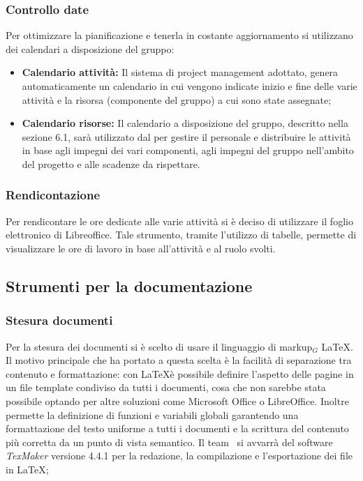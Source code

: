 \subsubsection{Controllo date}
Per ottimizzare la pianificazione e tenerla in costante aggiornamento si utilizzano dei calendari a disposizione del gruppo:
\begin{itemize}
\item \textbf{Calendario attività:} Il sistema di project management adottato, genera automaticamente un calendario in cui vengono indicate inizio e fine delle varie attività e la risorsa (componente del gruppo) a cui sono state assegnate;
\item \textbf{Calendario risorse:} Il calendario a disposizione del gruppo, descritto nella sezione 6.1, sarà utilizzato dal \ruoloResponsabile{} per gestire il personale e distribuire le attività in base agli impegni dei vari componenti, agli impegni del gruppo nell'ambito del progetto e alle scadenze da rispettare.
\end{itemize}

\subsubsection{Rendicontazione}
Per rendicontare le ore dedicate alle varie attività si è deciso di utilizzare il foglio elettronico di Libreoffice. Tale strumento, tramite l'utilizzo di tabelle, permette di visualizzare le ore di lavoro in base all'attività e al ruolo svolti.

\subsection{Strumenti per la documentazione}
\subsubsection{Stesura documenti}
Per la stesura dei documenti si è scelto di usare il linguaggio di markup$_G$ \LaTeX.
Il motivo principale che ha portato a questa scelta è la facilità di separazione tra contenuto e formattazione: con \LaTeX è possibile definire l’aspetto delle pagine in un file template condiviso da tutti i documenti, cosa che non sarebbe stata possibile optando per altre soluzioni come Microsoft Office o LibreOffice. Inoltre permette la definizione di funzioni e variabili globali garantendo una formattazione del testo uniforme a tutti i documenti e la scrittura del contenuto più corretta da un punto di vista semantico.
Il team \gruppo\ si avvarrà del software \textit{TexMaker} versione 4.4.1 per la redazione, la compilazione e l'esportazione dei file in \LaTeX;

